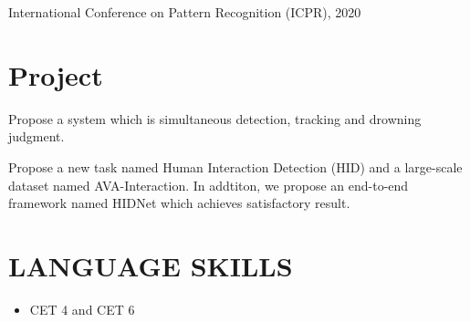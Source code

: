\documentclass{resume}
\begin{document}
International Conference on Pattern Recognition (ICPR), 2020




\section{Project}
Propose a system which is simultaneous detection, tracking and drowning judgment.

Propose a new task named Human Interaction Detection (HID) and a large-scale dataset named AVA-Interaction. In addtiton, we propose an end-to-end framework named HIDNet which achieves satisfactory result.

\section{LANGUAGE SKILLS}
\begin{itemize}
  \item CET 4 and CET 6
\end{itemize}


%
%
\end{document}
